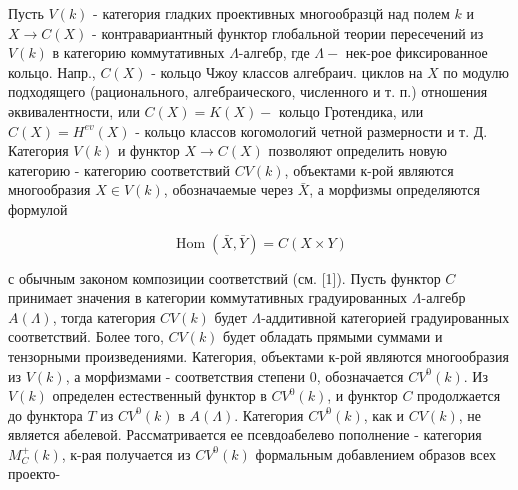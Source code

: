 \documentclass[10pt]{article}
\begin{document}
Пусть $V(k)$ - категория гладких проективных многообразцй над полем $k$ и $X \rightarrow C(X)$ - контравариантный функтор глобальной теории пересечений из $V(k)$ в категорию коммутативных $\Lambda$-алгебр, где $\Lambda-$ нек-рое фиксированное кольцо. Напр., $C(X)$ - кольцо Чжоу классов алгебраич. циклов на $X$ по модулю подходящего (рационального, алгебраического, численного и т. п.) отношения әквивалентности, или $C(X)=K(X)-$ кольцо Гротендика, или $C(X)=H^{e v}(X)$ - кольцо классов когомологий четной размерности и т. Д. Категория $V(k)$ и функтор $X \rightarrow C(X)$ позволяют определить новую категорию - категорию соответствий $C V(k)$, объектами к-рой являются многообразия $X \in V(k)$, обозначаемые через $\bar{X}$, а морфизмы определяются формулой



\[

\operatorname{Hom}(\bar{X}, \bar{Y})=C(X \times Y)

\]



с обычным законом композиции соответствий (см. [1]). Пусть функтор $C$ принимает значения в категории коммутативных градуированных $\Lambda$-алгебр $A(\Lambda)$, тогда категория $C V(k)$ будет $\Lambda$-аддитивной категорией градуированных соответствий. Более того, $C V(k)$ будет обладать прямыми суммами и тензорными произведениями. Категория, объектами к-рой являются многообразия из $V(k)$, а морфизмами - соответствия степени 0, обозначается $C V^{0}(k)$. Из $V(k)$ определен естественный функтор в $C V^{0}(k)$, и функтор $C$ продолжается до функтора $T$ из $C V^{0}(k)$ в $A(\Lambda)$. Категория $C V^{0}(k)$, как и $C V(k)$, не является абелевой. Рассматривается ее псевдоабелево пополнение - категория $M_{C}^{+}(k)$, к-рая получается из $C V^{0}(k)$ формальным добавлением образов всех проекто-
\end{document}
